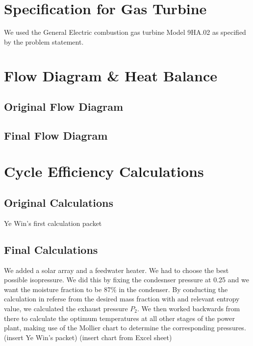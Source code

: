 \documentclass[12pt,letterpaper,notitlepage]{article}
\begin{document}
\section{Specification for Gas Turbine}
\label{sec:turbineSpec}
We used the General Electric combustion gas turbine Model 9HA.02 as specified by the problem statement.
\section{Flow Diagram \& Heat Balance}
\label{sec:flowDiagram}
\subsection{Original Flow Diagram}
\subsection{Final Flow Diagram}
\section{Cycle Efficiency Calculations}
\label{sec:cycleCalcs}
\subsection{Original Calculations}
Ye Win's first calculation packet
\subsection{Final Calculations}
We added a solar array and a feedwater heater. We had to choose the best possible isopressure. We did this by fixing the condesnser pressure at 0.25 and we want the moisture fraction to be 87\% in the condenser. By conducting the calculation in referse from the desired mass fraction with and relevant entropy value, we calculated the exhaust pressure $P_2$. We then worked backwards from there to calculate the optimum temperatures at all other stages of the power plant, making use of the Mollier chart to determine the corresponding pressures.
(insert Ye Win's packet)
(insert chart from Excel sheet)
\end{document}
